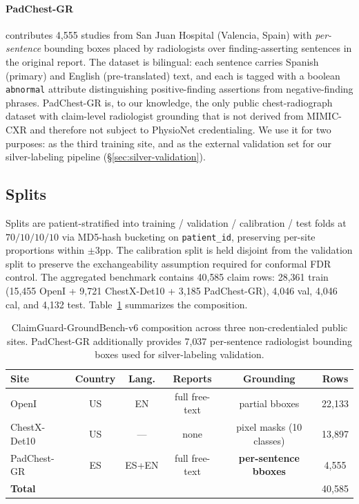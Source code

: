 \documentclass[pmlr]{jmlr}
\begin{document}
\paragraph{PadChest-GR} \citep{feijoo2024padchestgr} contributes 4{,}555 studies from San Juan Hospital (Valencia, Spain) with \emph{per-sentence} bounding boxes placed by radiologists over finding-asserting sentences in the original report. The dataset is bilingual: each sentence carries Spanish (primary) and English (pre-translated) text, and each is tagged with a boolean \texttt{abnormal} attribute distinguishing positive-finding assertions from negative-finding phrases. PadChest-GR is, to our knowledge, the only public chest-radiograph dataset with claim-level radiologist grounding that is not derived from MIMIC-CXR and therefore not subject to PhysioNet credentialing. We use it for two purposes: as the third training site, and as the external validation set for our silver-labeling pipeline (\S\ref{sec:silver-validation}).

\subsection{Splits}

Splits are patient-stratified into training / validation / calibration / test folds at $70 / 10 / 10 / 10$ via MD5-hash bucketing on \texttt{patient\_id}, preserving per-site proportions within $\pm 3$pp. The calibration split is held disjoint from the validation split to preserve the exchangeability assumption required for conformal FDR control. The aggregated benchmark contains 40{,}585 claim rows: 28{,}361 train (15{,}455 OpenI + 9{,}721 ChestX-Det10 + 3{,}185 PadChest-GR), 4{,}046 val, 4{,}046 cal, and 4{,}132 test. Table~\ref{tab:groundbench-v6} summarizes the composition.

\begin{table}[t]
\centering
\small
\caption{ClaimGuard-GroundBench-v6 composition across three non-credentialed public sites. PadChest-GR additionally provides 7{,}037 per-sentence radiologist bounding boxes used for silver-labeling validation.}
\label{tab:groundbench-v6}
\begin{tabular}{lccccc}
\toprule
\textbf{Site} & \textbf{Country} & \textbf{Lang.} & \textbf{Reports} & \textbf{Grounding} & \textbf{Rows} \\
\midrule
OpenI           & US & EN     & full free-text & partial bboxes          & 22{,}133 \\
ChestX-Det10    & US & ---    & none           & pixel masks (10 classes) & 13{,}897 \\
PadChest-GR     & ES & ES+EN  & full free-text & \textbf{per-sentence bboxes} & 4{,}555 \\
\midrule
\textbf{Total}  &    &        &                &                         & 40{,}585 \\
\bottomrule
\end{tabular}
\end{table}
\end{document}
